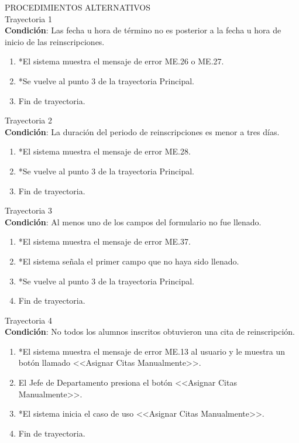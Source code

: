 \vspace*{1cm}
\Large{PROCEDIMIENTOS ALTERNATIVOS}\\
\large{Trayectoria 1}\\
\textbf{Condición}: Las fecha u hora de término no es posterior a la fecha u hora de inicio de las reinscripciones.
\begin{enumerate}
		\item *El sistema muestra el mensaje de error ME.26 o ME.27.
		\item *Se vuelve al punto 3 de la trayectoria Principal.
		\item Fin de trayectoria.
\end{enumerate}
\large{Trayectoria 2}\\
\textbf{Condición}: La duración del periodo de reinscripciones es menor a tres días.
\begin{enumerate}
		\item *El sistema muestra el mensaje de error ME.28.
		\item *Se vuelve al punto 3 de la trayectoria Principal.
		\item Fin de trayectoria.
\end{enumerate}
\large{Trayectoria 3}\\
\textbf{Condición}: Al menos uno de los campos del formulario no fue llenado.
\begin{enumerate}
		\item *El sistema muestra el mensaje de error ME.37.
		\item *El sistema señala el primer campo que no haya sido llenado.
		\item *Se vuelve al punto 3 de la trayectoria Principal.
		\item Fin de trayectoria.
\end{enumerate}
\large{Trayectoria 4}\\
\textbf{Condición}: No todos los alumnos inscritos obtuvieron una cita de reinscripción.
\begin{enumerate}
		\item *El sistema muestra el mensaje de error ME.13 al usuario y le muestra un botón llamado <<Asignar Citas Manualmente>>.
		\item El Jefe de Departamento presiona el botón <<Asignar Citas Manualmente>>.
		\item *El sistema inicia el caso de uso <<Asignar Citas Manualmente>>.
		\item Fin de trayectoria.
\end{enumerate}